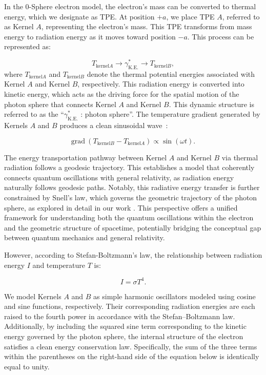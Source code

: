 \documentclass[%
 reprint,
 amsmath,amssymb,
 aps,
]{revtex4-1}
\numberwithin{equation}{section}%
\begin{document}
In the 0-Sphere electron model, the electron's mass can be converted to thermal energy, which we designate as TPE. At position $+a$, we place TPE $A$, referred to as Kernel $A$, representing the electron's mass. This TPE transforms from mass energy to radiation energy as it moves toward position $-a$. This process can be represented as:

\begin{equation}
T_{\mathrm{kernel}A} \rightarrow \gamma^*_{\mathrm{K.E.}} \rightarrow T_{\mathrm{kernel}B},
\label{eq:electron_transfer}
\end{equation}
where $T_{\mathrm{kernel}A}$ and $T_{\mathrm{kernel}B}$ denote the thermal potential energies associated with Kernel $A$ and Kernel $B$, respectively. This radiation energy is converted into kinetic energy, which acts as the driving force for the spatial motion of the photon sphere that connects Kernel $A$ and Kernel $B$. This dynamic structure is referred to as the ``$\gamma^*_{\mathrm{K.E.}}$ : photon sphere''. The temperature gradient generated by Kernels $A$ and $B$ produces a clean sinusoidal wave~\cite{hanamura2018}:

\begin{equation}
\mathrm{grad} \ (T_{\mathrm{kernel}B} - T_{\mathrm{kernel}A}) \propto \sin (\omega t) .
\label{e3_simple_harmonic_motion}
\end{equation}

The energy transportation pathway between Kernel $A$ and Kernel $B$ via thermal radiation follows a geodesic trajectory. This establishes a model that coherently connects quantum oscillations with general relativity, as radiation energy naturally follows geodesic paths. Notably, this radiative energy transfer is further constrained by Snell's law, which governs the geometric trajectory of the photon sphere, as explored in detail in our work \cite{hanamura2024}. This perspective offers a unified framework for understanding both the quantum oscillations within the electron and the geometric structure of spacetime, potentially bridging the conceptual gap between quantum mechanics and general relativity.

However, according to Stefan-Boltzmann's law, the relationship between radiation energy $I$ and temperature $T$ is:

\begin{equation}
I = \sigma T^4 .
\end{equation}

We model Kernels \( A \) and \( B \) as simple harmonic oscillators modeled using cosine and sine functions, respectively. Their corresponding radiation energies are each raised to the fourth power in accordance with the Stefan–Boltzmann law. Additionally, by including the squared sine term corresponding to the kinetic energy governed by the photon sphere, the internal structure of the electron satisfies a clean energy conservation law. Specifically, the sum of the three terms within the parentheses on the right-hand side of the equation below is identically equal to unity.
\end{document}
